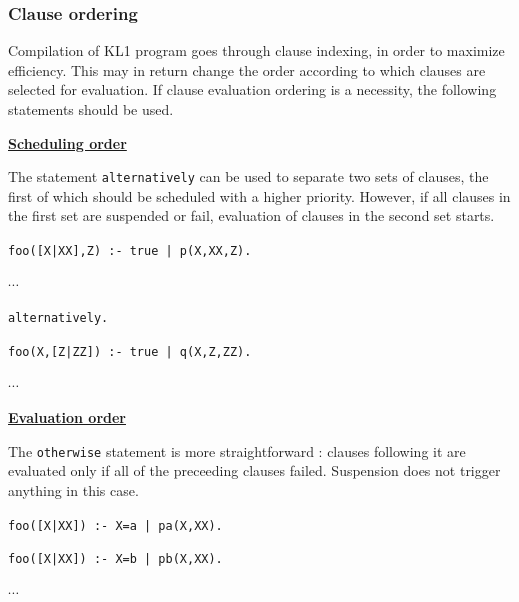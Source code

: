 \subsubsection{Clause ordering}

Compilation of KL1 program goes through clause indexing, in order to maximize
efficiency. This may in return change the order according to which clauses are
selected for evaluation. If clause evaluation ordering is a necessity, 
the following statements should be used.
\vspace{1ex}

\noindent\underline{\bf Scheduling order}\vspace{1ex}\par
The statement \verb|alternatively|
can be used to separate two sets of clauses,
the first of which should be scheduled with a higher priority. However, if all
clauses in the first set are suspended or fail, evaluation of clauses in
the second set starts.\vspace{1ex}

\hspace{19ex}\verb!foo([X|XX],Z) :- true | p(X,XX,Z).!

\hspace{30ex}$\cdots$

\hspace{19ex}\verb!alternatively.!

\hspace{19ex}\verb!foo(X,[Z|ZZ]) :- true | q(X,Z,ZZ).!

\hspace{30ex}$\cdots$
\vspace{1ex}

\noindent\underline{\bf Evaluation order}\vspace{1ex}\par
The \verb|otherwise| statement is more straightforward 
: clauses following it are evaluated only if all of the preceeding clauses
failed. Suspension does not trigger anything in this case.\vspace{1ex}

\hspace{19ex}\verb!foo([X|XX]) :- X=a | pa(X,XX).!

\hspace{19ex}\verb!foo([X|XX]) :- X=b | pb(X,XX).!

\hspace{30ex}$\cdots$

